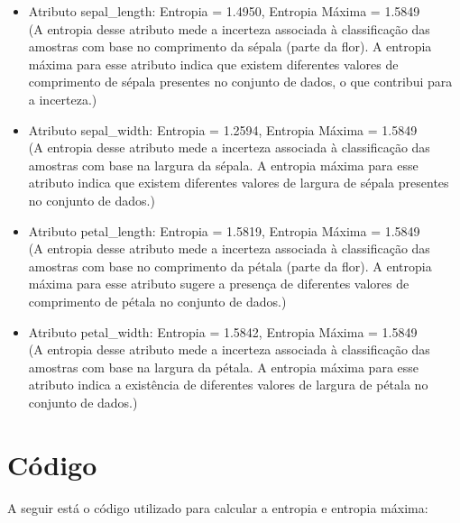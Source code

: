 \documentclass{article}
\begin{document}
\begin{itemize}
    \item Atributo sepal\_length: Entropia = 1.4950, Entropia Máxima = 1.5849 \\
    (A entropia desse atributo mede a incerteza associada à classificação das amostras com base no comprimento da sépala (parte da flor). A entropia máxima para esse atributo indica que existem diferentes valores de comprimento de sépala presentes no conjunto de dados, o que contribui para a incerteza.)
    
    \item Atributo sepal\_width: Entropia = 1.2594, Entropia Máxima = 1.5849 \\
    (A entropia desse atributo mede a incerteza associada à classificação das amostras com base na largura da sépala. A entropia máxima para esse atributo indica que existem diferentes valores de largura de sépala presentes no conjunto de dados.)
    
    \item Atributo petal\_length: Entropia = 1.5819, Entropia Máxima = 1.5849 \\
    (A entropia desse atributo mede a incerteza associada à classificação das amostras com base no comprimento da pétala (parte da flor). A entropia máxima para esse atributo sugere a presença de diferentes valores de comprimento de pétala no conjunto de dados.)
    
    \item Atributo petal\_width: Entropia = 1.5842, Entropia Máxima = 1.5849 \\
    (A entropia desse atributo mede a incerteza associada à classificação das amostras com base na largura da pétala. A entropia máxima para esse atributo indica a existência de diferentes valores de largura de pétala no conjunto de dados.)
\end{itemize}

\section{Código}

A seguir está o código utilizado para calcular a entropia e entropia máxima:
\end{document}
